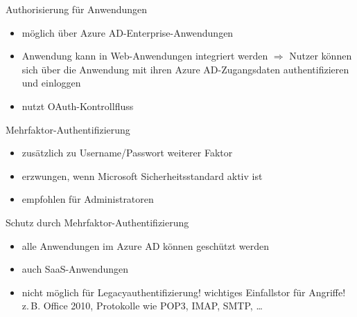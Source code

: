 \begin{flashcard}[Definition]{Authorisierung für Anwendungen}
  \begin{itemize}
    \item möglich über Azure AD-Enterprise-Anwendungen
    \item Anwendung kann in Web-Anwendungen integriert werden\newline
      $\Rightarrow$ Nutzer können sich über die Anwendung mit ihren Azure AD-Zugangsdaten authentifizieren und einloggen
    \item nutzt OAuth-Kontrollfluss
  \end{itemize}
\end{flashcard}


\begin{flashcard}[Definition]{Mehrfaktor-Authentifizierung}
  \begin{itemize}
    \item zusätzlich zu Username/Passwort weiterer Faktor
    \item erzwungen, wenn Microsoft Sicherheitsstandard aktiv ist
    \item empfohlen für Administratoren
  \end{itemize}
\end{flashcard}

\begin{flashcard}[Definition]{Schutz durch Mehrfaktor-Authentifizierung}
  \begin{itemize}
    \item alle Anwendungen im Azure AD können geschützt werden
    \item auch SaaS-Anwendungen
    \item nicht möglich für Legacyauthentifizierung!\newline
    wichtiges Einfallstor für Angriffe!\newline
    z.\,B. Office 2010, Protokolle wie POP3, IMAP, SMTP, \ldots
  \end{itemize}
\end{flashcard}

